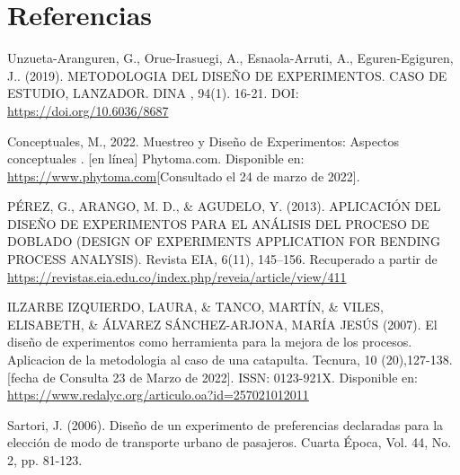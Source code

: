 \documentclass{article}
\begin{document}
\section*{Referencias}
Unzueta-Aranguren, G., Orue-Irasuegi, A., Esnaola-Arruti, A., Eguren-Egiguren, J.. (2019). METODOLOGIA DEL DISEÑO DE EXPERIMENTOS. CASO DE ESTUDIO, LANZADOR. DINA , 94(1). 16-21. DOI: \url{https://doi.org/10.6036/8687} \newline

Conceptuales, M., 2022. Muestreo y Diseño de Experimentos: Aspectos conceptuales . [en línea] Phytoma.com. Disponible en: \href{https://www.phytoma.com/la-revista/phytohemeroteca/164-diciembre-2004/muestreo-y-diseo-de-experimentos-aspectos-conceptuales}{https://www.phytoma.com}[Consultado el 24 de marzo de 2022]. \newline

PÉREZ, G., ARANGO, M. D., \& AGUDELO, Y. (2013). APLICACIÓN DEL DISEÑO DE EXPERIMENTOS PARA EL ANÁLISIS DEL PROCESO DE DOBLADO (DESIGN OF EXPERIMENTS APPLICATION FOR BENDING PROCESS ANALYSIS). Revista EIA, 6(11), 145–156. Recuperado a partir de \url{https://revistas.eia.edu.co/index.php/reveia/article/view/411} \newline

ILZARBE IZQUIERDO, LAURA, \& TANCO, MARTÍN, \& VILES, ELISABETH, \& ÁLVAREZ SÁNCHEZ-ARJONA, MARÍA JESÚS (2007). El diseño de experimentos como herramienta para la mejora de los procesos. Aplicacion de la metodologia al caso de una catapulta. Tecnura, 10 (20),127-138.[fecha de Consulta 23 de Marzo de 2022]. ISSN: 0123-921X. Disponible en: \url{https://www.redalyc.org/articulo.oa?id=257021012011} \newline

Sartori, J. (2006). Diseño de un experimento de preferencias declaradas para la elección de modo de
transporte urbano de pasajeros. Cuarta Época, Vol. 44, No. 2, pp. 81-123.
\end{document}
